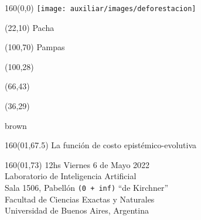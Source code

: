 \documentclass[shownotes,aspectratio=169]{beamer}
\begin{document}
\color{black!85}
\large

 

\begin{frame}


\begin{textblock}{160}(0,0)
\texttt{[image: auxiliar/images/deforestacion]}
\end{textblock}

\begin{textblock}{80}(22,10)
\textcolor{black!15}{\fontsize{44}{55}\selectfont Pacha}
\end{textblock}

\begin{textblock}{47}(100,70)
\centering \textcolor{black!15}{{\fontsize{52}{65}\selectfont Pampas}}
\end{textblock}

\begin{textblock}{80}(100,28)
\LARGE  \textcolor{black!15}{}
\end{textblock}


\begin{textblock}{80}(66,43)
\LARGE  \textcolor{black!15}{\scalebox{6}{$=$}}
\end{textblock}

\begin{textblock}{80}(36,29)
\LARGE  \textcolor{black!15}{\scalebox{9}{$p$}}
\end{textblock}

 \vspace{2cm}brown
\maketitle



\begin{textblock}{160}(01,67.5)
\normalsize \textcolor{black!5}{La función de costo epistémico-evolutiva}
\end{textblock} 

\begin{textblock}{160}(01,73)
\scriptsize \textcolor{black!5}{12hs Viernes 6 de Mayo 2022 \\
Laboratorio de Inteligencia Artificial \\ 
Sala 1506, Pabellón \texttt{(0 + inf)} ``de Kirchner'' \\
Facultad de Ciencias Exactas y Naturales \\ 
Universidad de Buenos Aires, Argentina}
\end{textblock} 

\end{frame}
\end{document}
